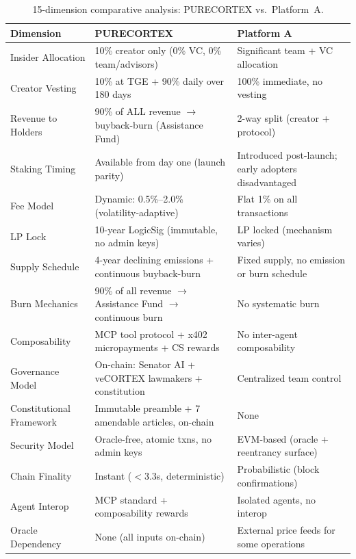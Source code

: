 \begin{table}[H]
\centering
\caption{15-dimension comparative analysis: PURECORTEX vs.\ Platform~A.}
\label{tab:comparison}
\small
\begin{tabular}{@{}p{2.8cm}p{4.8cm}p{4.8cm}@{}}
\toprule
\textbf{Dimension} & \textbf{PURECORTEX} & \textbf{Platform A} \\
\midrule
Insider Allocation & 10\% creator only (0\% VC, 0\% team/advisors) & Significant team + VC allocation \\
\addlinespace
Creator Vesting & 10\% at TGE + 90\% daily over 180 days & 100\% immediate, no vesting \\
\addlinespace
Revenue to Holders & 90\% of ALL revenue $\to$ buyback-burn (Assistance Fund) & 2-way split (creator + protocol) \\
\addlinespace
Staking Timing & Available from day one (launch parity) & Introduced post-launch; early adopters disadvantaged \\
\addlinespace
Fee Model & Dynamic: 0.5\%--2.0\% (volatility-adaptive) & Flat 1\% on all transactions \\
\addlinespace
LP Lock & 10-year LogicSig (immutable, no admin keys) & LP locked (mechanism varies) \\
\addlinespace
Supply Schedule & 4-year declining emissions + continuous buyback-burn & Fixed supply, no emission or burn schedule \\
\addlinespace
Burn Mechanics & 90\% of all revenue $\to$ Assistance Fund $\to$ continuous burn & No systematic burn \\
\addlinespace
Composability & MCP tool protocol + x402 micropayments + CS rewards & No inter-agent composability \\
\addlinespace
Governance Model & On-chain: Senator AI + veCORTEX lawmakers + constitution & Centralized team control \\
\addlinespace
Constitutional Framework & Immutable preamble + 7 amendable articles, on-chain & None \\
\addlinespace
Security Model & Oracle-free, atomic txns, no admin keys & EVM-based (oracle + reentrancy surface) \\
\addlinespace
Chain Finality & Instant ($<3.3$s, deterministic) & Probabilistic (block confirmations) \\
\addlinespace
Agent Interop & MCP standard + composability rewards & Isolated agents, no interop \\
\addlinespace
Oracle Dependency & None (all inputs on-chain) & External price feeds for some operations \\
\bottomrule
\end{tabular}
\end{table}


